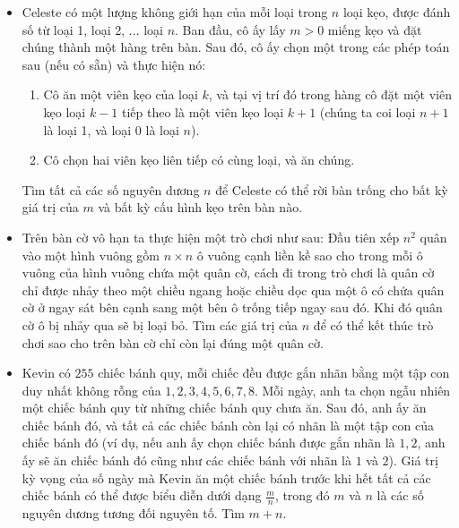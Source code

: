 \documentclass[11pt]{scrartcl}
\begin{document}
\begin{itemize}[label=, leftmargin=0em, itemsep=0.5em]
    \item \begin{btvn}
        Celeste có một lượng không giới hạn của mỗi loại trong $n$ loại kẹo, được đánh số từ loại 1, loại 2, ... loại $n$. Ban đầu, cô ấy lấy $m>0$ miếng kẹo và đặt chúng thành một hàng trên bàn. Sau đó, cô ấy chọn một trong các phép toán sau (nếu có sẵn) và thực hiện nó:
        \begin{enumerate}
            \item Cô ăn một viên kẹo của loại $k$, và tại vị trí đó trong hàng cô đặt một viên kẹo loại $k-1$ tiếp theo là một viên kẹo loại $k+1$ (chúng ta coi loại $n+1$ là loại 1, và loại 0 là loại $n$).
            \item Cô chọn hai viên kẹo liên tiếp có cùng loại, và ăn chúng.
        \end{enumerate}
        Tìm tất cả các số nguyên dương $n$ để Celeste có thể rời bàn trống cho bất kỳ giá trị của $m$ và bất kỳ cấu hình kẹo trên bàn nào.
    \end{btvn}

    \item \begin{btvn} Trên bàn cờ vô hạn ta thực hiện một trò chơi như sau: Đầu tiên xếp $n^2$ quân vào một hình vuông gồm $n \times n$ ô vuông cạnh liền kề sao cho trong mỗi ô vuông của hình vuông chứa một quân cờ, cách đi trong trò chơi là quân cờ chỉ được nhảy theo một chiều ngang hoặc chiều dọc qua một ô có chứa quân cờ ở ngay sát bên cạnh sang một bên ô trống tiếp ngay sau đó. Khi đó quân cờ ô bị nhảy qua sẽ bị loại bỏ. Tìm các giá trị của $n$ để có thể kết thúc trò chơi sao cho trên bàn cờ chỉ còn lại đúng một quân cờ.
    \end{btvn}


    \item \begin{btvn}
        Kevin có $255$ chiếc bánh quy, mỗi chiếc đều được gắn nhãn bằng một tập con duy nhất không rỗng của ${1,2,3,4,5,6,7,8}$. Mỗi ngày, anh ta chọn ngẫu nhiên một chiếc bánh quy từ những chiếc bánh quy chưa ăn. Sau đó, anh ấy ăn chiếc bánh đó, và tất cả các chiếc bánh còn lại có nhãn là một tập con của chiếc bánh đó (ví dụ, nếu anh ấy chọn chiếc bánh được gắn nhãn là ${1,2}$, anh ấy sẽ ăn chiếc bánh đó cũng như các chiếc bánh với nhãn là ${1}$ và ${2}$). Giá trị kỳ vọng của số ngày mà Kevin ăn một chiếc bánh trước khi hết tất cả các chiếc bánh có thể được biểu diễn dưới dạng $\frac{m}{n}$, trong đó $m$ và $n$ là các số nguyên dương tương đối nguyên tố. Tìm $m + n$.
    \end{btvn}


\end{itemize}
\end{document}
